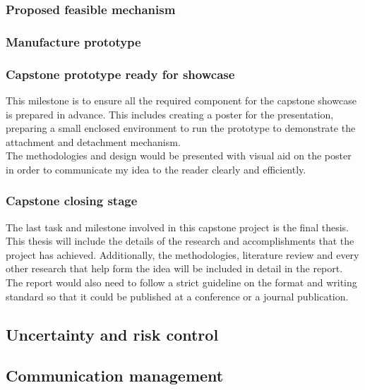 \documentclass[12pt,A4]{article}
\begin{document}
	\subsubsection{Proposed feasible mechanism}
	
	\subsubsection{Manufacture prototype}
	
	\subsubsection{Capstone prototype ready for showcase}
	
	This milestone is to ensure all the required component for the capstone showcase is prepared in advance. This includes creating a poster for the presentation, preparing a small enclosed environment to run the prototype to demonstrate the attachment and detachment mechanism.\\
	
	The methodologies and design would be presented with visual aid on the poster in order to communicate my idea to the reader clearly and efficiently.\\
	
	\subsubsection{Capstone closing stage}
	
	The last task and milestone involved in this capstone project is the final thesis. This thesis will include the details of the research and accomplishments that the project has achieved. Additionally, the methodologies, literature review and every other research that help form the idea will be included in detail in the report. The report would also need to follow a strict guideline on the format and writing standard so that it could be published at a conference or a journal publication.\\
	
	\subsection{Uncertainty and risk control}
	
	\subsection{Communication management}
	
\end{document}
